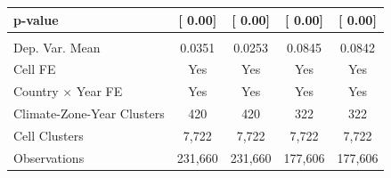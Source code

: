 {\begin{tabular}{l*{4}{c}}
\hspace{15pt} p-value&[     0.00]         &[     0.00]         &[     0.00]         &[     0.00]         \\
\hline \\ Dep. Var. Mean&0.0351         &0.0253         &0.0845         &0.0842         \\
Cell FE             &   Yes         &   Yes         &   Yes         &   Yes         \\
Country $\times$ Year FE&   Yes         &   Yes         &   Yes         &   Yes         \\
Climate-Zone-Year Clusters&   420         &   420         &   322         &   322         \\
Cell Clusters       & 7,722         & 7,722         & 7,722         & 7,722         \\
Observations        &231,660         &231,660         &177,606         &177,606         \\
\bottomrule
\end{tabular}
}
